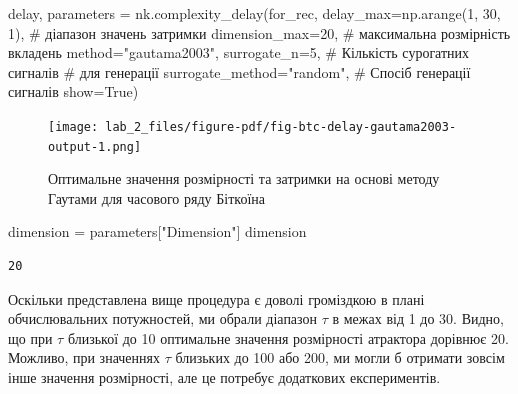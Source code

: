 \documentclass[
  letterpaper,
]{report}
\newenvironment{Shaded}{\begin{snugshade}}{\end{snugshade}}
\newcommand{\CommentTok}[1]{\textcolor[rgb]{0.37,0.37,0.37}{#1}}
\newcommand{\DecValTok}[1]{\textcolor[rgb]{0.68,0.00,0.00}{#1}}
\newcommand{\NormalTok}[1]{\textcolor[rgb]{0.00,0.23,0.31}{#1}}
\newcommand{\OperatorTok}[1]{\textcolor[rgb]{0.37,0.37,0.37}{#1}}
\newcommand{\StringTok}[1]{\textcolor[rgb]{0.13,0.47,0.30}{#1}}
\newcommand{\VariableTok}[1]{\textcolor[rgb]{0.07,0.07,0.07}{#1}}
\begin{document}
\begin{Shaded}
\begin{Highlighting}[]
\NormalTok{delay, parameters }\OperatorTok{=}\NormalTok{ nk.complexity\_delay(for\_rec,}
\NormalTok{    delay\_max}\OperatorTok{=}\NormalTok{np.arange(}\DecValTok{1}\NormalTok{, }\DecValTok{30}\NormalTok{, }\DecValTok{1}\NormalTok{), }\CommentTok{\# діапазон значень затримки}
\NormalTok{    dimension\_max}\OperatorTok{=}\DecValTok{20}\NormalTok{,              }\CommentTok{\# максимальна розмірність вкладень}
\NormalTok{    method}\OperatorTok{=}\StringTok{"gautama2003"}\NormalTok{,}
\NormalTok{    surrogate\_n}\OperatorTok{=}\DecValTok{5}\NormalTok{,                 }\CommentTok{\# Кількість сурогатних сигналів }
                                   \CommentTok{\# для генерації}
\NormalTok{    surrogate\_method}\OperatorTok{=}\StringTok{"random"}\NormalTok{,     }\CommentTok{\# Спосіб генерації сигналів}
\NormalTok{    show}\OperatorTok{=}\VariableTok{True}\NormalTok{)}
 
\end{Highlighting}
\end{Shaded}

\begin{figure}[H]

{\centering \texttt{[image: lab\_2\_files/figure-pdf/fig-btc-delay-gautama2003-output-1.png]}

}

\caption{\label{fig-btc-delay-gautama2003}Оптимальне значення
розмірності та затримки на основі методу Гаутами для часового ряду
Біткоїна}

\end{figure}

\begin{Shaded}
\begin{Highlighting}[]
\NormalTok{dimension }\OperatorTok{=}\NormalTok{ parameters[}\StringTok{"Dimension"}\NormalTok{]}
\NormalTok{dimension}
\end{Highlighting}
\end{Shaded}

\begin{verbatim}
20
\end{verbatim}

Оскільки представлена вище процедура є доволі громіздкою в плані
обчислювальних потужностей, ми обрали діапазон \(\tau\) в межах від 1 до
30. Видно, що при \(\tau\) близької до 10 оптимальне значення
розмірності атрактора дорівнює 20. Можливо, при значеннях \(\tau\)
близьких до 100 або 200, ми могли б отримати зовсім інше значення
розмірності, але це потребує додаткових експериментів.
\end{document}
